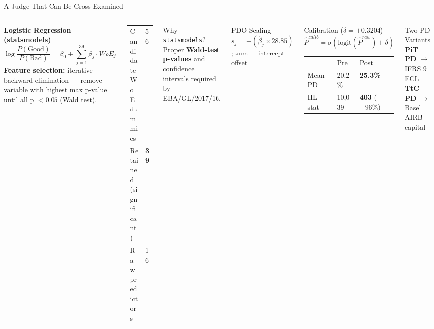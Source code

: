 \documentclass[aspectratio=169,11pt]{beamer}
\newcommand{\B}[1]{\textbf{#1}}
\begin{document}
\begin{frame}{A Judge That Can Be Cross-Examined}
  \begin{columns}[T]
      \small\textbf{Logistic Regression (statsmodels)}
      \[\log\frac{P(\text{Good})}{P(\text{Bad})} = \beta_0 + \sum_{j=1}^{39} \beta_j \cdot WoE_j\]
      \vspace{-4pt}
      {\small\B{Feature selection:} iterative backward elimination --- remove variable with highest max p-value until all p $< 0.05$ (Wald test).}

      \vspace{3pt}
      \small\begin{tabular}{ll}
        \toprule
        Candidate WoE dummies & 56 \\
        Retained (significant) & \B{39} \\
        Raw predictors & 16 \\
        \bottomrule
      \end{tabular}

      \vspace{4pt}
      {\footnotesize Why \texttt{statsmodels}? Proper \B{Wald-test p-values} and confidence intervals required by EBA/GL/2017/16.}

      \begin{block}{PDO Scaling}\small
        $s_j = -(\hat{\beta}_j \times 28.85)$; sum + intercept offset
      \end{block}
      \vspace{4pt}
      \begin{block}{Calibration ($\delta = +0.3204$)}\small
        $\hat{P}^{calib} = \sigma(\text{logit}(\hat{P}^{raw}) + \delta)$\\[2pt]
        \begin{tabular}{lll}
          & Pre & Post \\
          Mean PD & 20.2\% & \B{25.3\%} \\
          HL stat & 10,039 & \B{403} ($-96\%$) \\
        \end{tabular}
      \end{block}
      \vspace{4pt}
      \begin{exampleblock}{Two PD Variants}\small
        \textbf{PiT PD} $\to$ IFRS 9 ECL\\
        \textbf{TtC PD} $\to$ Basel AIRB capital
      \end{exampleblock}
  \end{columns}
\end{frame}
\end{document}
